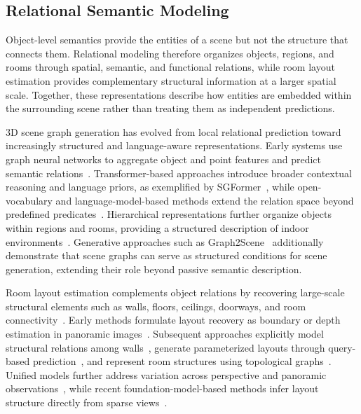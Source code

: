 \documentclass{SCIS2026}
\begin{document}
\subsection{Relational Semantic Modeling}

Object-level semantics provide the entities of a scene but not the structure that connects them. Relational modeling therefore organizes objects, regions, and rooms through spatial, semantic, and functional relations, while room layout estimation provides complementary structural information at a larger spatial scale. Together, these representations describe how entities are embedded within the surrounding scene rather than treating them as independent predictions.

3D scene graph generation has evolved from local relational prediction toward increasingly structured and language-aware representations. Early systems use graph neural networks to aggregate object and point features and predict semantic relations~\cite{Wu2021}. Transformer-based approaches introduce broader contextual reasoning and language priors, as exemplified by SGFormer~\cite{lv2024sgformer}, while open-vocabulary and language-model-based methods extend the relation space beyond predefined predicates~\cite{chen2024sdsgg}. Hierarchical representations further organize objects within regions and rooms, providing a structured description of indoor environments~\cite{armeni20193d}. Generative approaches such as Graph2Scene~\cite{chen2025graph2scene} additionally demonstrate that scene graphs can serve as structured conditions for scene generation, extending their role beyond passive semantic description.

Room layout estimation complements object relations by recovering large-scale structural elements such as walls, floors, ceilings, doorways, and room connectivity~\cite{zou2018layoutnet}. Early methods formulate layout recovery as boundary or depth estimation in panoramic images~\cite{Sun2019HorizonNet,Wang2021LED2}. Subsequent approaches explicitly model structural relations among walls~\cite{jiang2022lgt}, generate parameterized layouts through query-based prediction~\cite{mia2026layout}, and represent room structures using topological graphs~\cite{yao2023undirected}. Unified models further address variation across perspective and panoramic observations~\cite{Lee2025uLayout}, while recent foundation-model-based methods infer layout structure directly from sparse views~\cite{Huang2025PlaneDUSt3R}.
\end{document}
